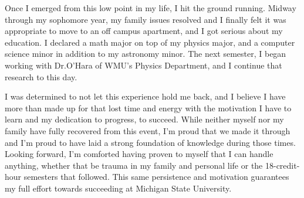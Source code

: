 \documentclass[11pt]{article}
\newcommand{\school}{Michigan State University}
\begin{document}
Once I emerged from this low point in my life, I hit the ground running. Midway through my sophomore year, my family issues resolved and I finally felt it was appropriate to move to an off campus apartment, and I got serious about my education. I declared a math major on top of my physics major, and a computer science minor in addition to my astronomy minor. The next semester, I began working with Dr.\@ O'Hara of WMU's Physics Department, and I continue that research to this day.

I was determined to not let this experience hold me back, and I believe I have more than made up for that lost time and energy with the motivation I have to learn and my dedication to progress, to succeed. While neither myself nor my family have fully recovered from this event, I'm proud that we made it through and I'm proud to have laid a strong foundation of knowledge during those times. Looking forward, I'm comforted having proven to myself that I can handle anything, whether that be trauma in my family and personal life or the 18-credit-hour semesters that followed. This same persistence and motivation guarantees my full effort towards succeeding at \school{}.
\end{document}
